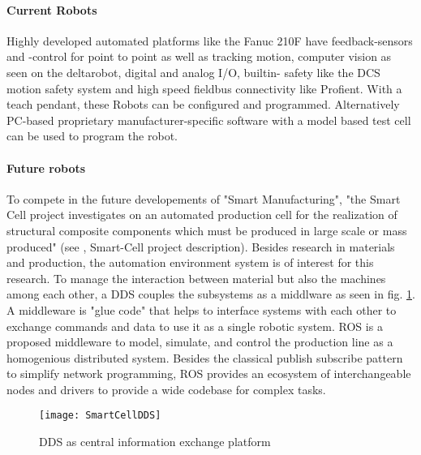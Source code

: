 \paragraph{Current Robots}
Highly developed automated platforms like the Fanuc 210F have feedback-sensors and -control for point to point as well as tracking motion, computer vision as seen on the deltarobot, digital and analog I/O,  builtin- safety like the \ac{DCS} motion safety system and high speed fieldbus connectivity like Profient.
With a teach pendant, these Robots can be configured and programmed. Alternatively \ac{PC}-based proprietary manufacturer-specific software with a model based test cell can be used to program the robot. 
\medskip

\paragraph{Future robots}
To compete in the future developements of "Smart Manufacturing", "the Smart Cell  project investigates on an automated production cell for the realization of structural composite components which must be produced in large scale or mass produced" (see \cite{SPCWebsite}, Smart-Cell project description). 
Besides research in materials and production, the automation environment system is of interest for this research.
To manage the interaction between material but also the machines among each other, a \ac{DDS} couples the subsystems as a middlware as seen in \ac{fig}. \ref{fig:SmartCellDDS}. A middleware is "glue code" that helps to interface systems with each other to exchange commands and data to use it as a single robotic system. 
\ac{ROS} is a proposed middleware to model, simulate, and control the production line as a homogenious distributed system. 
Besides the classical publish subscribe  pattern to simplify network programming, \ac{ROS} provides an ecosystem of interchangeable nodes and drivers to provide a wide codebase for complex tasks.
\medskip
\begin{figure}[H]
	\texttt{[image: SmartCellDDS]}
	\caption{\ac{DDS} as central information exchange platform}
	\label{fig:SmartCellDDS}
\end{figure}

%
